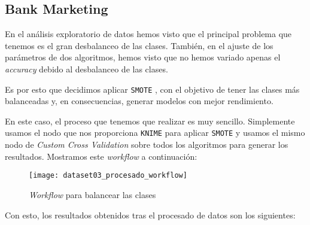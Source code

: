 \documentclass[11pt]{article}
\begin{document}
\pagebreak

\subsection{Bank Marketing}

En el análisis exploratorio de datos hemos visto que el principal problema que tenemos es el gran desbalanceo de las clases. También, en el ajuste de los parámetros de dos algoritmos, hemos visto que no hemos variado apenas el \emph{accuracy} debido al desbalanceo de las clases.

Es por esto que decidimos aplicar \lstinline{SMOTE} \cite{smote:online}, con el objetivo de tener las clases más balanceadas y, en consecuencias, generar modelos con mejor rendimiento.

En este caso, el proceso que tenemos que realizar es muy sencillo. Simplemente usamos el nodo que nos proporciona \lstinline{KNIME} para aplicar \lstinline{SMOTE} y usamos el mismo nodo de \emph{Custom Cross Validation} sobre todos los algoritmos para generar los resultados. Mostramos este \emph{workflow} a continuación:

\begin{figure}[h]
    \centering
    \texttt{[image: dataset03\_procesado\_workflow]}
    \caption{\emph{Workflow} para balancear las clases}
\end{figure}


Con esto, los resultados obtenidos tras el procesado de datos son los siguientes:

\begin{table}[H]
\begin{center}
\end{center}
    \caption{Resultados de \emph{Cross Validation} tras aplicar \lstinline{SMOTE}}
\end{table}
\end{document}
